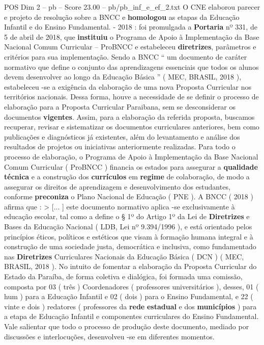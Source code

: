 \begin{textsample}{POS Dim 2 – pb – Score 23.00 – pb/pb\_inf\_e\_ef\_2.txt}
O CNE elaborou parecer e projeto de resolução sobre a BNCC e \textbf{homologou} as etapas da Educação Infantil e do Ensino Fundamental. - 2018 : foi promulgada a \textbf{Portaria} nº 331, de 5 de abril de 2018, que \textbf{instituiu} o Programa de Apoio à Implementação da Base Nacional Comum Curricular – ProBNCC e estabeleceu \textbf{diretrizes}, parâmetros e critérios para sua implementação.
Sendo a BNCC “ um documento de caráter normativo que define o conjunto das aprendizagens essenciais que todos os alunos devem desenvolver ao longo da Educação Básica ” ( MEC, BRASIL, 2018 ), estabeleceu -se a exigência da elaboração de uma nova Proposta Curricular nos territórios nacionais.
Dessa forma, houve a necessidade de se definir o processo de elaboração para a Proposta Curricular Paraibana, sem se desconsiderar os documentos \textbf{vigentes}.
Assim, para a elaboração da referida proposta, buscamos recuperar, revisar e sistematizar os documentos curriculares anteriores, bem como publicações e diagnósticos já existentes, além do levantamento e análise dos resultados de projetos ou iniciativas anteriormente realizadas.
Para todo o processo de elaboração, o Programa de Apoio à Implementação da Base Nacional Comum Curricular ( ProBNCC ) financia os estados para assegurar a \textbf{qualidade} \textbf{técnica} e a construção dos \textbf{currículos} em \textbf{regime} de colaboração, de modo a assegurar os direitos de aprendizagem e desenvolvimento dos estudantes, conforme \textbf{preconiza} o Plano Nacional de Educação ( PNE ).
A BNCC ( 2018 ) afirma que : > [... ] este documento normativo aplica -se exclusivamente à educação escolar, tal como a define o § 1º do Artigo 1º da Lei de \textbf{Diretrizes} e Bases da Educação Nacional ( LDB, Lei nº 9.394/1996 ), e está orientado pelos princípios éticos, políticos e estéticos que visam à formação humana integral e à construção de uma sociedade justa, democrática e inclusiva, como fundamentado nas \textbf{Diretrizes} Curriculares Nacionais da Educação Básica ( DCN ) ( MEC, BRASIL, 2018 ).
No intuito de fomentar a elaboração da Proposta Curricular do Estado da Paraíba, de forma coletiva e dialógica, foi formada uma comissão, composta por 03 ( três ) Coordenadores ( professores universitários ), desses, 01 ( hum ) para a Educação Infantil e 02 ( dois ) para o Ensino Fundamental, e 22 ( vinte e dois ) redatores ( professores da \textbf{rede} \textbf{estadual} e dos \textbf{municípios} ) para a etapa de Educação Infantil e componentes curriculares do Ensino Fundamental.
Vale salientar que todo o processo de produção deste documento, mediado por discussões e interlocuções, desenvolveu -se em diferentes momentos.

\end{textsample}
